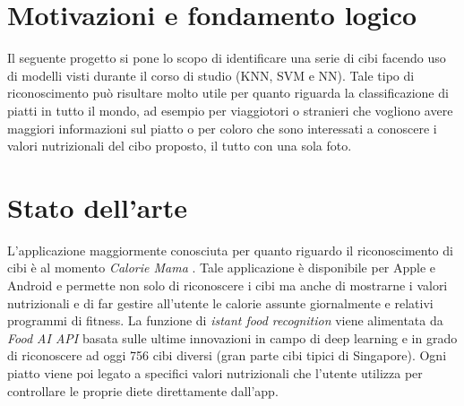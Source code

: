 \documentclass[11pt, a4paper, titlepage]{article}
\begin{document}
\begin{frontespizio}
\Margini{2.5cm}{3cm}{2.5cm}{3cm}
\Sottotitolo{}
\end{frontespizio}
%


\tableofcontents
\newpage

\section{Motivazioni e fondamento logico}
Il seguente progetto si pone lo scopo di identificare una serie di cibi facendo uso di modelli visti durante il corso di studio (KNN, SVM e NN). Tale tipo di riconoscimento può risultare molto utile per quanto riguarda la classificazione di piatti in tutto il mondo, ad esempio per viaggiotori o stranieri che vogliono avere maggiori informazioni sul piatto o per coloro che sono interessati a conoscere i valori nutrizionali del cibo proposto, il tutto con una sola foto. 

\section{Stato dell'arte}
L'applicazione maggiormente conosciuta per quanto riguardo il riconoscimento di cibi è al momento \emph{Calorie Mama} \cite{calorie-mama}. Tale applicazione è disponibile per Apple e Android e permette non solo di riconoscere i cibi ma anche di mostrarne i valori nutrizionali e di far gestire all'utente le calorie assunte giornalmente e relativi programmi di fitness. La funzione di \textit{istant food recognition} viene alimentata da \textit{Food AI API} \cite{foodai} basata sulle ultime innovazioni in campo di deep learning e in grado di riconoscere ad oggi 756 cibi diversi (gran parte cibi tipici di Singapore). Ogni piatto viene poi legato a specifici valori nutrizionali che l'utente utilizza per controllare le proprie diete direttamente dall'app.
\end{document}
